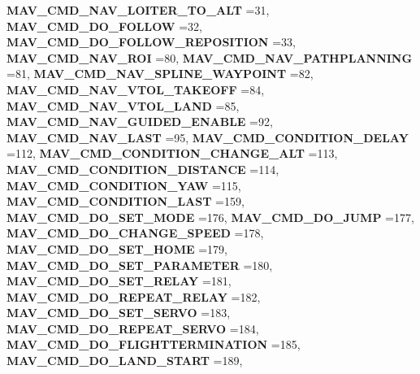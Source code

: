 \begin{DoxyCompactItemize}
\textbf{ M\+A\+V\+\_\+\+C\+M\+D\+\_\+\+N\+A\+V\+\_\+\+L\+O\+I\+T\+E\+R\+\_\+\+T\+O\+\_\+\+A\+LT} =31, 
\textbf{ M\+A\+V\+\_\+\+C\+M\+D\+\_\+\+D\+O\+\_\+\+F\+O\+L\+L\+OW} =32, 
\textbf{ M\+A\+V\+\_\+\+C\+M\+D\+\_\+\+D\+O\+\_\+\+F\+O\+L\+L\+O\+W\+\_\+\+R\+E\+P\+O\+S\+I\+T\+I\+ON} =33, 
\newline
\textbf{ M\+A\+V\+\_\+\+C\+M\+D\+\_\+\+N\+A\+V\+\_\+\+R\+OI} =80, 
\textbf{ M\+A\+V\+\_\+\+C\+M\+D\+\_\+\+N\+A\+V\+\_\+\+P\+A\+T\+H\+P\+L\+A\+N\+N\+I\+NG} =81, 
\textbf{ M\+A\+V\+\_\+\+C\+M\+D\+\_\+\+N\+A\+V\+\_\+\+S\+P\+L\+I\+N\+E\+\_\+\+W\+A\+Y\+P\+O\+I\+NT} =82, 
\textbf{ M\+A\+V\+\_\+\+C\+M\+D\+\_\+\+N\+A\+V\+\_\+\+V\+T\+O\+L\+\_\+\+T\+A\+K\+E\+O\+FF} =84, 
\newline
\textbf{ M\+A\+V\+\_\+\+C\+M\+D\+\_\+\+N\+A\+V\+\_\+\+V\+T\+O\+L\+\_\+\+L\+A\+ND} =85, 
\textbf{ M\+A\+V\+\_\+\+C\+M\+D\+\_\+\+N\+A\+V\+\_\+\+G\+U\+I\+D\+E\+D\+\_\+\+E\+N\+A\+B\+LE} =92, 
\textbf{ M\+A\+V\+\_\+\+C\+M\+D\+\_\+\+N\+A\+V\+\_\+\+L\+A\+ST} =95, 
\textbf{ M\+A\+V\+\_\+\+C\+M\+D\+\_\+\+C\+O\+N\+D\+I\+T\+I\+O\+N\+\_\+\+D\+E\+L\+AY} =112, 
\newline
\textbf{ M\+A\+V\+\_\+\+C\+M\+D\+\_\+\+C\+O\+N\+D\+I\+T\+I\+O\+N\+\_\+\+C\+H\+A\+N\+G\+E\+\_\+\+A\+LT} =113, 
\textbf{ M\+A\+V\+\_\+\+C\+M\+D\+\_\+\+C\+O\+N\+D\+I\+T\+I\+O\+N\+\_\+\+D\+I\+S\+T\+A\+N\+CE} =114, 
\textbf{ M\+A\+V\+\_\+\+C\+M\+D\+\_\+\+C\+O\+N\+D\+I\+T\+I\+O\+N\+\_\+\+Y\+AW} =115, 
\textbf{ M\+A\+V\+\_\+\+C\+M\+D\+\_\+\+C\+O\+N\+D\+I\+T\+I\+O\+N\+\_\+\+L\+A\+ST} =159, 
\newline
\textbf{ M\+A\+V\+\_\+\+C\+M\+D\+\_\+\+D\+O\+\_\+\+S\+E\+T\+\_\+\+M\+O\+DE} =176, 
\textbf{ M\+A\+V\+\_\+\+C\+M\+D\+\_\+\+D\+O\+\_\+\+J\+U\+MP} =177, 
\textbf{ M\+A\+V\+\_\+\+C\+M\+D\+\_\+\+D\+O\+\_\+\+C\+H\+A\+N\+G\+E\+\_\+\+S\+P\+E\+ED} =178, 
\textbf{ M\+A\+V\+\_\+\+C\+M\+D\+\_\+\+D\+O\+\_\+\+S\+E\+T\+\_\+\+H\+O\+ME} =179, 
\newline
\textbf{ M\+A\+V\+\_\+\+C\+M\+D\+\_\+\+D\+O\+\_\+\+S\+E\+T\+\_\+\+P\+A\+R\+A\+M\+E\+T\+ER} =180, 
\textbf{ M\+A\+V\+\_\+\+C\+M\+D\+\_\+\+D\+O\+\_\+\+S\+E\+T\+\_\+\+R\+E\+L\+AY} =181, 
\textbf{ M\+A\+V\+\_\+\+C\+M\+D\+\_\+\+D\+O\+\_\+\+R\+E\+P\+E\+A\+T\+\_\+\+R\+E\+L\+AY} =182, 
\textbf{ M\+A\+V\+\_\+\+C\+M\+D\+\_\+\+D\+O\+\_\+\+S\+E\+T\+\_\+\+S\+E\+R\+VO} =183, 
\newline
\textbf{ M\+A\+V\+\_\+\+C\+M\+D\+\_\+\+D\+O\+\_\+\+R\+E\+P\+E\+A\+T\+\_\+\+S\+E\+R\+VO} =184, 
\textbf{ M\+A\+V\+\_\+\+C\+M\+D\+\_\+\+D\+O\+\_\+\+F\+L\+I\+G\+H\+T\+T\+E\+R\+M\+I\+N\+A\+T\+I\+ON} =185, 
\textbf{ M\+A\+V\+\_\+\+C\+M\+D\+\_\+\+D\+O\+\_\+\+L\+A\+N\+D\+\_\+\+S\+T\+A\+RT} =189, 

\end{DoxyCompactItemize}
